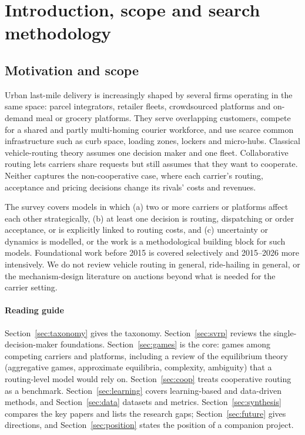 \documentclass[preprint,12pt]{elsarticle}
\begin{document}
\section{Introduction, scope and search methodology}\label{sec:intro}

\subsection{Motivation and scope}

Urban last-mile delivery is increasingly shaped by several firms operating in the same space: parcel integrators, retailer fleets, crowdsourced platforms and on-demand meal or grocery platforms. They serve overlapping customers, compete for a shared and partly multi-homing courier workforce, and use scarce common infrastructure such as curb space, loading zones, lockers and micro-hubs. Classical vehicle-routing theory assumes one decision maker and one fleet. Collaborative routing lets carriers share requests but still assumes that they want to cooperate. Neither captures the non-cooperative case, where each carrier's routing, acceptance and pricing decisions change its rivals' costs and revenues.

The survey covers models in which (a) two or more carriers or platforms affect each other strategically, (b) at least one decision is routing, dispatching or order acceptance, or is explicitly linked to routing costs, and (c) uncertainty or dynamics is modelled, or the work is a methodological building block for such models. Foundational work before 2015 is covered selectively and 2015--2026 more intensively. We do not review vehicle routing in general, ride-hailing in general, or the mechanism-design literature on auctions beyond what is needed for the carrier setting.

\paragraph{Reading guide} Section~\ref{sec:taxonomy} gives the taxonomy. Section~\ref{sec:svrp} reviews the single-decision-maker foundations. Section~\ref{sec:games} is the core: games among competing carriers and platforms, including a review of the equilibrium theory (aggregative games, approximate equilibria, complexity, ambiguity) that a routing-level model would rely on. Section~\ref{sec:coop} treats cooperative routing as a benchmark. Section~\ref{sec:learning} covers learning-based and data-driven methods, and Section~\ref{sec:data} datasets and metrics. Section~\ref{sec:synthesis} compares the key papers and lists the research gaps; Section~\ref{sec:future} gives directions, and Section~\ref{sec:position} states the position of a companion project.
\end{document}
